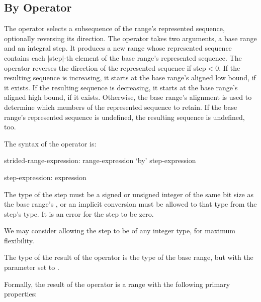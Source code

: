 \subsection{By Operator}
\label{By_Operator_For_Ranges}

The  operator selects a subsequence of the range's represented sequence,
optionally reversing its direction.
The operator takes two arguments, a base range and an integral step.
It produces a new range whose represented sequence contains
each $|$step$|$-th element of the base range's represented sequence.
The operator reverses the direction of the represented sequence if step$<$0.
If the resulting sequence is increasing,
it starts at the base range's aligned low bound, if it exists.
If the resulting sequence is decreasing,
it starts at the base range's aligned high bound, if it exists.
%
Otherwise, the base range's alignment is used to determine
which members of the represented sequence to retain.
%
If the base range's represented sequence is undefined,
the resulting sequence is undefined, too.

The syntax of the  operator is:
\begin{syntax}
strided-range-expression:
  range-expression `by' step-expression

step-expression:
  expression
\end{syntax}

The type of the step must be a signed or unsigned integer of the same
bit size as the base range's , or an implicit conversion must be allowed
to that type from the step's type.
It is an error for the step to be zero.

\begin{future}
We may consider allowing the step to be of any integer type,
for maximum flexibility.
\end{future}

The type of the result of the  operator is the type of the
base range, but with the  parameter set to .

Formally, the result of the  operator is a range with the following
primary properties:

